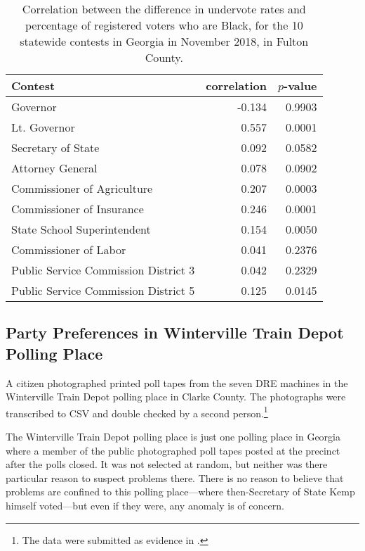 \documentclass[runningheads]{llncs}
\begin{document}
\begin{table}[ht]
\caption{Correlation between the difference in undervote rates and percentage of registered voters who are Black, for the 10 statewide contests in Georgia in November 2018, in Fulton County.}
\begin{center}
\begin{tabular}{|l|r|r|}
Contest					        & correlation & $p$-value \\
 \hline
Governor						& -0.134       & 0.9903 \\
Lt. Governor 					& 0.557        & 0.0001 \\
Secretary of State 				& 0.092        & 0.0582 \\
Attorney General				& 0.078        & 0.0902 \\
Commissioner of Agriculture		& 0.207        & 0.0003 \\
Commissioner of Insurance		& 0.246        & 0.0001 \\
State School Superintendent		& 0.154        & 0.0050 \\
Commissioner of Labor			& 0.041        & 0.2376 \\
Public Service Commission District 3 & 0.042       & 0.2329 \\
Public Service Commission District 5 & 0.125       & 0.0145
\end{tabular}
\end{center}
\label{tab:fulton}
\end{table}%




\subsection{Party Preferences in Winterville Train Depot Polling Place}
A citizen photographed printed poll tapes from the seven DRE machines in the Winterville Train Depot
polling place in Clarke County.
The photographs were transcribed to CSV and double checked by a second person.\footnote{%
The data were submitted as evidence in \cite{coalition_crittenden_2019}.
}

The Winterville Train Depot polling place is just one polling place in Georgia where a member of the public photographed
poll tapes posted at the precinct after the polls closed.
It was not selected at random, but neither was there particular reason to suspect problems
there. 
There is no reason to believe that problems are confined to this polling place---where then-Secretary of State Kemp himself voted---but even if they were, any anomaly is of concern.
\end{document}
